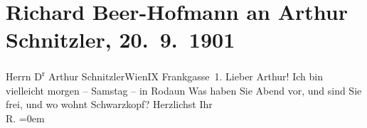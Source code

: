 

         
         \renewcommand{\erwaehntePersonen}{Personen: Gustav Schwarzkopf}
         \renewcommand{\erwaehnteOrte}{Orte: Frankgasse, IX., Alsergrund, Rodaun, Wien}
         \renewcommand{\erwaehnteWerke}{}
               \section[Richard Beer-Hofmann an Arthur Schnitzler, 20. 9. 1901]{ Richard Beer-Hofmann an Arthur Schnitzler,
                    20. 9. 1901}\nopagebreak{}\rehead{ }\begin{ledgroupsized}[t]{13cm}\normalsize\beginnumbering \toendnotes[C]{\smallbreak\pagebreak[2]} 
\pstart{}{\pb}Herrn D\textsuperscript{r} Arthur Schnitzler\pend{}\pstart{}Wien\pend{}\pstart{}IX Frankgasse 1.\pend{}{\bigskip}\pstart
           \noindent{}{\pb}Lieber Arthur! Ich bin vielleicht morgen – Samstag
                    – in Rodaun\pend
           \pstart
           Was haben Sie Abend vor, und sind Sie frei, und wo wohnt Schwarzkopf?\pend
           \pstart
           Herzlichst Ihr{\\[\baselineskip]}\spacefill\mbox{R.}\pend
           \leftskip=0em{}
         
         \endnumbering{}\end{ledgroupsized}  \newcommand{\dateiname}{L01174}\newcommand{\titel}{Richard Beer-Hofmann an Arthur Schnitzler, 20. 9. 1901}\newcommand{\editorInnen}{Martin Anton Müller und Gerd-Hermann Susen}
      